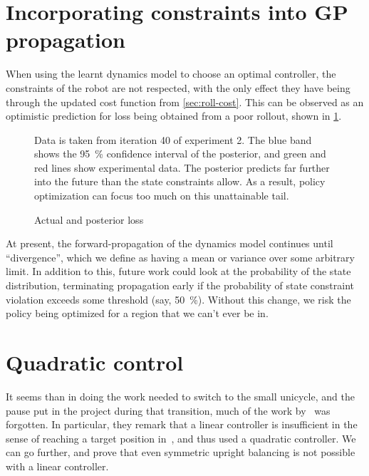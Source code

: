\documentclass[main.tex]{subfiles}
\begin{document}
\section{Incorporating constraints into GP propagation}

	When using the learnt dynamics model to choose an optimal controller, the constraints of the robot are not respected, with the only effect they have being through the updated cost function from \cref{sec:roll-cost}.
	This can be observed as an optimistic prediction for loss being obtained from a poor rollout, shown in \cref{fig:loss-prediction}.
	\begin{figure}[b!]
		\begin{minipage}{\linewidth/2-2em}
			
		\end{minipage}\hfill%
		\begin{minipage}{\linewidth/2-2em}
			\caption{Actual and posterior loss}
			\label{fig:loss-prediction}
			\small
			\medskip
			Data is taken from iteration 40 of experiment 2.
			The blue band shows the \SI{95}{\percent} confidence interval of the posterior, and green and red lines show experimental data.
			The posterior predicts far further into the future than the state constraints allow.
			As a result, policy optimization can focus too much on this unattainable tail.
		\end{minipage}
	\end{figure}
	At present, the forward-propagation of the dynamics model continues until \enquote{divergence}, which we define as having a mean or variance over some arbitrary limit.
	In addition to this, future work could look at the probability of the state distribution, terminating propagation early if the probability of state constraint violation exceeds some threshold (say, \SI{50}{\percent}).
	Without this change, we risk the policy being optimized for a region that we can't ever be in.

\section{Quadratic control}

	It seems than in doing the work needed to switch to the small unicycle, and the pause put in the project during that transition, much of the work by~\citeauthor{queiro} was forgotten.
	In particular, they remark that a linear controller is insufficient in the sense of reaching a target position in~\cite[fig.~8]{queiro}, and thus used a quadratic controller.
	We can go further, and prove that even symmetric upright balancing is not possible with a linear controller.
\end{document}

